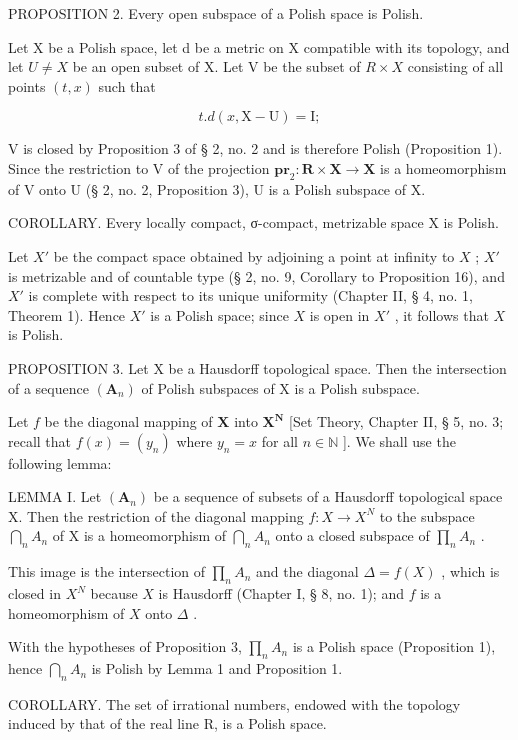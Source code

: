 PROPOSITION 2. Every open subspace of a Polish space is Polish.

Let X be a Polish space, let d be a metric on X compatible with its topology, and let \(U \neq X\) be an open subset of X. Let V be the subset of \(R \times X\) consisting of all points \((t, x)\) such that

\[
t. d (x, \mathrm{X} - \mathrm{U}) = \mathrm{I};
\]

V is closed by Proposition 3 of § 2, no. 2 and is therefore Polish (Proposition 1). Since the restriction to V of the projection \(\mathbf{pr}_{2}:\mathbf{R}\times\mathbf{X}\to\mathbf{X}\) is a homeomorphism of V onto U (§ 2, no. 2, Proposition 3), U is a Polish subspace of X.

COROLLARY. Every locally compact, σ-compact, metrizable space X is Polish.

Let \(X'\) be the compact space obtained by adjoining a point at infinity to \(X\) ; \(X'\) is metrizable and of countable type (§ 2, no. 9, Corollary to Proposition 16), and \(X'\) is complete with respect to its unique uniformity (Chapter II, § 4, no. 1, Theorem 1). Hence \(X'\) is a Polish space; since \(X\) is open in \(X'\) , it follows that \(X\) is Polish.

PROPOSITION 3. Let X be a Hausdorff topological space. Then the intersection of a sequence \((\mathbf{A}_{n})\) of Polish subspaces of X is a Polish subspace.

Let \(f\) be the diagonal mapping of \(\mathbf{X}\) into \(\mathbf{X}^{\mathbf{N}}\) {[}Set Theory, Chapter II, § 5, no. 3; recall that \(f(x) = (y_n)\) where \(y_n = x\) for all \(n \in \mathbb{N}\) {]}. We shall use the following lemma:

LEMMA I. Let \((\mathbf{A}_{n})\) be a sequence of subsets of a Hausdorff topological space X. Then the restriction of the diagonal mapping \(f: X \to X^{N}\) to the subspace \(\bigcap_{n} A_{n}\) of X is a homeomorphism of \(\bigcap_{n} A_{n}\) onto a closed subspace of \(\prod_{n} A_{n}\) .

This image is the intersection of \(\prod_{n} A_n\) and the diagonal \(\Delta = f(X)\) , which is closed in \(X^N\) because \(X\) is Hausdorff (Chapter I, § 8, no. 1); and \(f\) is a homeomorphism of \(X\) onto \(\Delta\) .

With the hypotheses of Proposition 3, \(\prod_{n} A_{n}\) is a Polish space (Proposition 1), hence \(\bigcap_{n} A_{n}\) is Polish by Lemma 1 and Proposition 1.

COROLLARY. The set of irrational numbers, endowed with the topology induced by that of the real line R, is a Polish space.

